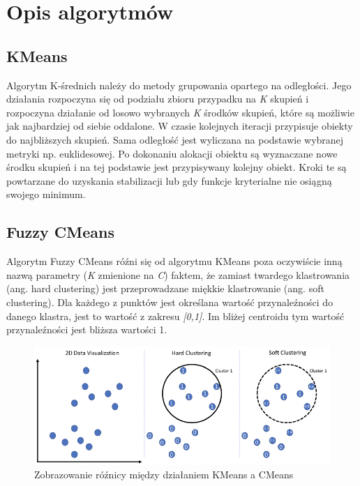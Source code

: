\documentclass{classrep}
\begin{document}
    \section{Opis algorytmów} {

        \subsection{KMeans} {
            Algorytm K-średnich należy do metody grupowania opartego na odległości.
            Jego działania rozpoczyna się od podziału zbioru przypadku na \textit{K}
            skupień i rozpoczyna działanie od losowo wybranych \textit{K} środków
            skupień, które są możliwie jak najbardziej od siebie oddalone. W czasie
            kolejnych iteracji przypisuje obiekty do najbliższych skupień. Sama
            odległość jest wyliczana na podstawie wybranej metryki np. euklidesowej. Po
            dokonaniu alokacji obiektu są wyznaczane nowe środku skupień i na tej
            podstawie jest przypisywany kolejny obiekt. Kroki te są powtarzane do
            uzyskania stabilizacji lub gdy funkcje kryterialne nie osiągną swojego
            minimum.
        }

        \subsection{Fuzzy CMeans} {
            Algorytm Fuzzy CMeans róźni się od algorytmu KMeans poza oczywiście inną
            nazwą parametry (\textit{K} zmienione na \textit{C}) faktem, że zamiast
            twardego klastrowania (ang. hard clustering) jest przeprowadzane miękkie
            klastrowanie (ang. soft clustering). Dla każdego z punktów jest określana
            wartość przynaleźności do danego klastra, jest to wartość z zakresu
            \textit{[0,1]}. Im bliżej centroidu tym wartość przynaleźności jest bliższa
            wartości 1.

            \begin{figure}[!htbp]
                \centering
                \includegraphics[width=\textwidth]{img/cmeans_explanation.png}
                \caption
                {Zobrazowanie róźnicy między działaniem KMeans a CMeans \cite{cmeans_desc_img}}
                \label{fig:cmeans_expl}
            \end{figure}
            \FloatBarrier
        }
    }
\end{document}
